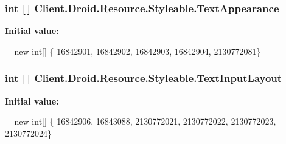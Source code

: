 \subsubsection[{Text\+Appearance}]{\setlength{\rightskip}{0pt plus 5cm}int \mbox{[}$\,$\mbox{]} Client.\+Droid.\+Resource.\+Styleable.\+Text\+Appearance\hspace{0.3cm}{\ttfamily [static]}}\label{classClient_1_1Droid_1_1Resource_1_1Styleable_a6204cea58e4754ba66771975d6f4209a}
{\bfseries Initial value\+:}
\begin{DoxyCode}
= \textcolor{keyword}{new} \textcolor{keywordtype}{int}[]
            \{
                    16842901,
                    16842902,
                    16842903,
                    16842904,
                    2130772081\}
\end{DoxyCode}
\hypertarget{classClient_1_1Droid_1_1Resource_1_1Styleable_a58798d997824fcd75ae6c8de395196f2}{}
\subsubsection[{Text\+Input\+Layout}]{\setlength{\rightskip}{0pt plus 5cm}int \mbox{[}$\,$\mbox{]} Client.\+Droid.\+Resource.\+Styleable.\+Text\+Input\+Layout\hspace{0.3cm}{\ttfamily [static]}}\label{classClient_1_1Droid_1_1Resource_1_1Styleable_a58798d997824fcd75ae6c8de395196f2}
{\bfseries Initial value\+:}
\begin{DoxyCode}
= \textcolor{keyword}{new} \textcolor{keywordtype}{int}[]
            \{
                    16842906,
                    16843088,
                    2130772021,
                    2130772022,
                    2130772023,
                    2130772024\}
\end{DoxyCode}
\hypertarget{classClient_1_1Droid_1_1Resource_1_1Styleable_a62471d53a203d054bba27142b29fa08e}{}
